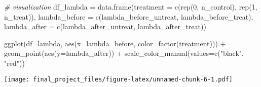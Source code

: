 \documentclass[
]{article}
\newenvironment{Shaded}{\begin{snugshade}}{\end{snugshade}}
\newcommand{\AttributeTok}[1]{\textcolor[rgb]{0.77,0.63,0.00}{#1}}
\newcommand{\CommentTok}[1]{\textcolor[rgb]{0.56,0.35,0.01}{\textit{#1}}}
\newcommand{\DecValTok}[1]{\textcolor[rgb]{0.00,0.00,0.81}{#1}}
\newcommand{\FunctionTok}[1]{\textcolor[rgb]{0.00,0.00,0.00}{#1}}
\newcommand{\NormalTok}[1]{#1}
\newcommand{\OtherTok}[1]{\textcolor[rgb]{0.56,0.35,0.01}{#1}}
\newcommand{\SpecialCharTok}[1]{\textcolor[rgb]{0.00,0.00,0.00}{#1}}
\newcommand{\StringTok}[1]{\textcolor[rgb]{0.31,0.60,0.02}{#1}}
\begin{document}
\begin{Shaded}
\begin{Highlighting}[]
\CommentTok{\# visualization}
\NormalTok{df\_lambda }\OtherTok{=} \FunctionTok{data.frame}\NormalTok{(}\AttributeTok{treatment =} \FunctionTok{c}\NormalTok{(}\FunctionTok{rep}\NormalTok{(}\DecValTok{0}\NormalTok{, n\_control), }\FunctionTok{rep}\NormalTok{(}\DecValTok{1}\NormalTok{, n\_treat)),}
                      \AttributeTok{lambda\_before =} \FunctionTok{c}\NormalTok{(lambda\_before\_untreat, lambda\_before\_treat),}
                      \AttributeTok{lambda\_after =} \FunctionTok{c}\NormalTok{(lambda\_after\_untreat, lambda\_after\_treat))}

\FunctionTok{ggplot}\NormalTok{(df\_lambda, }\FunctionTok{aes}\NormalTok{(}\AttributeTok{x=}\NormalTok{lambda\_before, }\AttributeTok{color=}\FunctionTok{factor}\NormalTok{(treatment))) }\SpecialCharTok{+}
  \FunctionTok{geom\_point}\NormalTok{(}\FunctionTok{aes}\NormalTok{(}\AttributeTok{y=}\NormalTok{lambda\_after)) }\SpecialCharTok{+} 
  \FunctionTok{scale\_color\_manual}\NormalTok{(}\AttributeTok{values=}\FunctionTok{c}\NormalTok{(}\StringTok{"black"}\NormalTok{, }\StringTok{"red"}\NormalTok{))}
\end{Highlighting}
\end{Shaded}

\texttt{[image: final\_project\_files/figure-latex/unnamed-chunk-6-1.pdf]}
\end{document}
